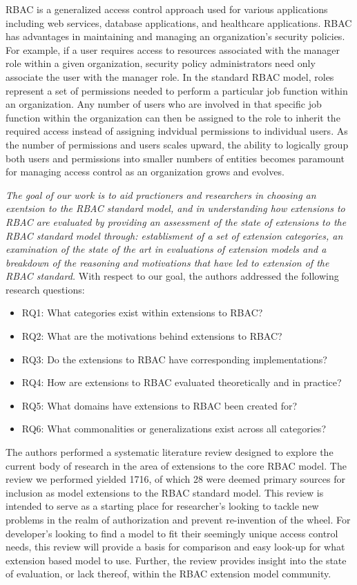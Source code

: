 RBAC is a generalized access control approach used for various applications including web services, database applications, and healthcare applications.  
RBAC has advantages in maintaining and managing an organization's security policies.  
For example, if a user requires access to resources associated with the manager role within a given organization, security policy administrators need only associate the user with the manager role.
In the standard RBAC model, roles represent a set of permissions needed to perform a particular job function within an organization.  
Any number of users who are involved in that specific job function within the organization can then be assigned to the role to inherit the required access instead of assigning indvidual permissions to individual users. 
As the number of permissions and users scales upward, the ability to logically group both users and permissions into smaller numbers of entities becomes paramount for managing access control as an organization grows and evolves.

\textit{The goal of our work is to aid practioners and researchers in choosing an exentsion to the RBAC standard model, and in understanding
how extensions to RBAC are evaluated by providing an assessment of the state of extensions to the RBAC standard model through: establisment of a 
set of extension categories, an examination of the state of the art in evaluations of extension models and a breakdown of the reasoning and motivations
that have led to extension of the RBAC standard.} With respect to our goal, the authors addressed the following research questions:

\begin{itemize}
\setlength{\itemsep}{0.25pt}
\item RQ1: What categories exist within extensions to RBAC?
\item RQ2: What are the motivations behind extensions to RBAC?
\item RQ3: Do the extensions to RBAC have corresponding implementations?
\item RQ4: How are extensions to RBAC evaluated theoretically and in practice?
\item RQ5: What domains have extensions to RBAC been created for?
\item RQ6: What commonalities or generalizations exist across all categories?
\end{itemize}

The authors performed a systematic literature review designed to explore the current body of research in the area of extensions to the core RBAC model.  The review we performed yielded 1716, of which 28 were deemed primary sources for inclusion as model extensions to the RBAC standard model.  This review is intended to serve as a starting place for researcher's looking to tackle new problems in the realm of authorization and prevent re-invention of the wheel. For developer's looking to find a model to fit their seemingly unique access control needs, this review will provide a basis for comparison and easy look-up for what extension based model to use.  Further, the review provides insight into the state of evaluation, or lack thereof, within the RBAC extension model community.

